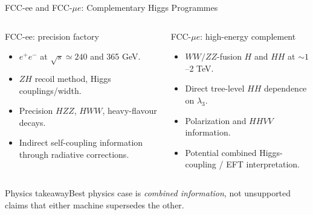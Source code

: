 \documentclass[aspectratio=1610,english]{beamer}
\newcommand{\src}[1]{\vfill{\par\color{black!65}\fontsize{6.4}{7.4}\selectfont\emph{Source:} #1\par}}
\newcommand{\key}[1]{\begin{alertblock}{Physics takeaway}\scriptsize #1\end{alertblock}}
\begin{document}
\begin{frame}[t]{FCC-ee and FCC-$\mu e$: Complementary Higgs Programmes}
\small

\begin{columns}%
\begin{exampleblock}{FCC-ee: precision factory}
\begin{itemize}
\justifying
\item $e^+e^-$ at $\sqrt{s}\simeq240$ and 365 GeV.
\item $ZH$ recoil method, Higgs couplings/width.
\item Precision $HZZ$, $HWW$, heavy-flavour decays.
\item Indirect self-coupling information through radiative corrections.
\end{itemize}\end{exampleblock}
\begin{alertblock}{FCC-$\mu e$: high-energy complement}
\begin{itemize}
\justifying
\item $WW/ZZ$-fusion $H$ and $HH$ at $\sim1$--2 TeV.
\item Direct tree-level $HH$ dependence on $\lambda_3$.
\item Polarization and $HHVV$ information.
\item Potential combined Higgs-coupling / EFT interpretation.
\end{itemize}\end{alertblock}
\end{columns}
\key{Best physics case is \emph{combined information}, not unsupported claims that either machine supersedes the other.}

\end{frame}
\end{document}
